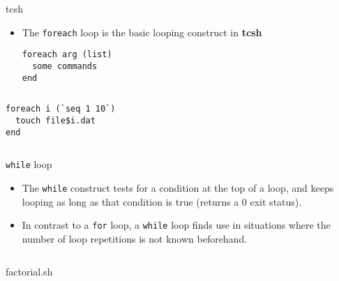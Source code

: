 \documentclass[slidestop,mathserif,compress,xcolor=svgnames]{beamer}
\newenvironment{bblock}[0]
{
\begin{beamerboxesrounded}[upper=uppercol1,lower=lowercol1,shadow=true]}
{\end{beamerboxesrounded}}
\newenvironment{eblock}[0]
{
\begin{beamerboxesrounded}[upper=uppercol2,lower=lowercol2,shadow=true]}
{\end{beamerboxesrounded}}
\begin{document}
\begin{frame}
  \begin{bblock}{tcsh}
    \begin{itemize}
      \item The \texttt{foreach} loop is the basic looping construct in \textbf{tcsh}
      \begin{lstlisting}
foreach arg (list)
  some commands
end
      \end{lstlisting}
    \end{itemize}
  \end{bblock}
  \begin{columns}
    \begin{bblock}{}
      \begin{lstlisting}
foreach i (`seq 1 10`)
  touch file$i.dat
end
      \end{lstlisting}
    \end{bblock}
  \end{columns}
  \begin{eblock}{\texttt{while} loop}
    \begin{itemize}
      \item The \texttt{while} construct tests for a condition at the top of a loop, and keeps looping as long as that condition is true (returns a 0 exit status). 
      \item In contrast to a \texttt{for} loop, a \texttt{while} loop finds use in situations where the number of loop repetitions is not known beforehand.
     \end{itemize}
  \end{eblock}
  \begin{columns}
    \vspace{-0.2cm}
    \begin{eblock}{factorial.sh}

\end{eblock}
\end{columns}
\end{frame}
\end{document}
